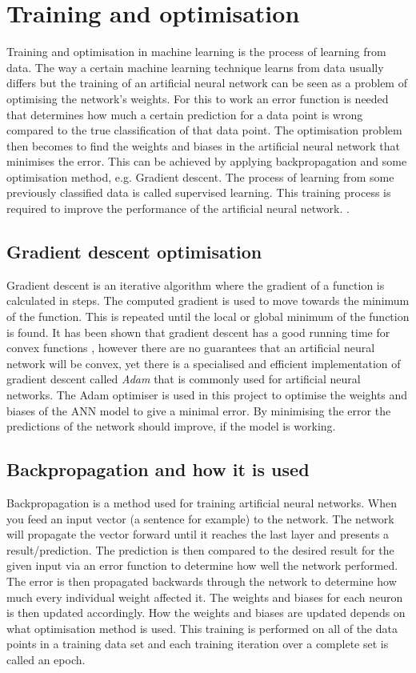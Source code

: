 \section{Training and optimisation} \label{sec:trainingoptimisation}
Training and optimisation in machine learning is the process of learning from data. The way a certain machine learning technique learns from data usually differs but the training of an artificial neural network can be seen as a problem of optimising the network's weights. For this to work an error function is needed that determines how much a certain prediction for a data point is wrong compared to the true classification of that data point. The optimisation problem then becomes to find the weights and biases in the artificial neural network that minimises the error. This can be achieved by applying backpropagation and some optimisation method, e.g. Gradient descent. The process of learning from some previously classified data is called supervised learning. This training process is required to improve the performance of  the artificial neural network. \parencite{Goodfellow-et-al-2016}.

\subsection{Gradient descent optimisation}\label{sec:gradient_descent}
Gradient descent is an iterative algorithm where the gradient of a function is calculated in steps. The computed gradient is used to move towards the minimum of the function. This is repeated until the local or global minimum of the function is found. It has been shown that gradient descent has a good running time for convex functions \parencite{convexSGD}, however there are no guarantees that an artificial neural network will be convex, yet there is a specialised and efficient implementation of gradient descent called \textit{Adam} \parencite{adamoptimizer} that is commonly used for artificial neural networks. The Adam optimiser is used in this project to optimise the weights and biases of the ANN model to give a minimal error. By minimising the error the predictions of the network should improve, if the model is working.

\subsection{Backpropagation and how it is used}\label{sec:backpropagation}
Backpropagation is a method used for training artificial neural networks. When you feed an input vector (a sentence for example) to the network. The network will propagate the vector forward until it reaches the last layer and presents a result/prediction. The prediction is then compared to the desired result for the given input via an error function to determine how well the network performed. The error is then propagated backwards through the network to determine how much every individual weight affected it. The weights and biases for each neuron is then updated accordingly. How the weights and biases are updated depends on what optimisation method is used. This training is performed on all of the data points in a training data set and each training iteration over a complete set is called an epoch.

